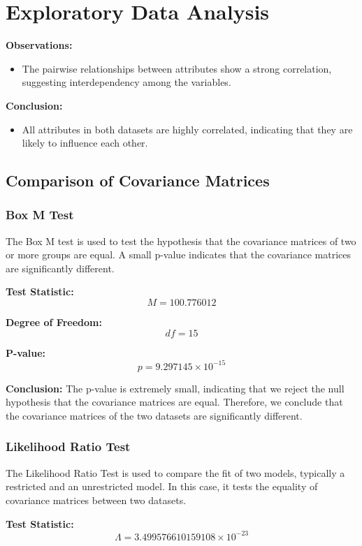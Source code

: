 \documentclass[11pt]{article}
\begin{document}
\section{Exploratory Data Analysis}
\textbf{Observations:}
\begin{itemize}
    \item The pairwise relationships between attributes show a strong correlation, suggesting interdependency among the variables.
\end{itemize}
\textbf{Conclusion:}
\begin{itemize}
    \item All attributes in both datasets are highly correlated, indicating that they are likely to influence each other.
\end{itemize}

\subsection{Comparison of Covariance Matrices}

\subsubsection{Box M Test}
The Box M test is used to test the hypothesis that the covariance matrices of two or more groups are equal. A small p-value indicates that the covariance matrices are significantly different.

\textbf{Test Statistic:} 
\[
M = 100.776012
\]

\textbf{Degree of Freedom:}
\[
df = 15
\]

\textbf{P-value:} 
\[
p = 9.297145 \times 10^{-15}
\]

\textbf{Conclusion:}
The p-value is extremely small, indicating that we reject the null hypothesis that the covariance matrices are equal. Therefore, we conclude that the covariance matrices of the two datasets are significantly different.

\subsubsection{Likelihood Ratio Test}
The Likelihood Ratio Test is used to compare the fit of two models, typically a restricted and an unrestricted model. In this case, it tests the equality of covariance matrices between two datasets.

\textbf{Test Statistic:} 
\[
\Lambda = 3.499576610159108 \times 10^{-23}
\]
\end{document}
